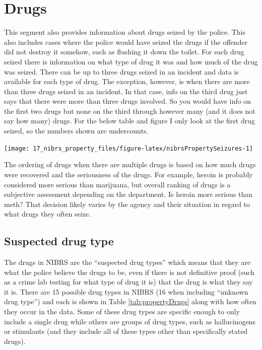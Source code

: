 \documentclass[
]{krantz}
\let\origfigure\figure
\let\endorigfigure\endfigure
\renewenvironment{figure}[1][2] {
    \expandafter\origfigure\expandafter[H]
} {
    \endorigfigure
}
\begin{document}
\section{Drugs}\label{drugs}

This segment also provides information about drugs seized by
the police. This also includes cases where the police would
have seized the drugs if the offender did not destroy it
somehow, such as flushing it down the toilet. For each drug
seized there is information on what type of drug it was and
how much of the drug was seized. There can be up to three
drugs seized in an incident and data is available for each
type of drug. The exception, however, is when there are more
than three drugs seized in an incident. In that case, info
on the third drug just says that there were more than three
drugs involved. So you would have info on the first two
drugs but none on the third through however many (and it
does not say how many) drugs. For the below table and figure
I only look at the first drug seized, so the numbers shown
are undercounts.

\begin{figure}

{\centering \texttt{[image: 17\_nibrs\_property\_files/figure-latex/nibrsPropertySeizures-1]} 

}

\caption{The annual number of drug seizures reported, 1991-2022.}\label{fig:nibrsPropertySeizures}
\end{figure}

The ordering of drugs when there are multiple drugs is based
on how much drugs were recovered and the seriousness of the
drugs. For example, heroin is probably considered more
serious than marijuana, but overall ranking of drugs is a
subjective assessment depending on the department. Is heroin
more serious than meth? That decision likely varies by the
agency and their situation in regard to what drugs they
often seize.

\subsection{Suspected drug type}\label{suspected-drug-type}

The drugs in NIBRS are the ``suspected drug types'' which
means that they are what the police believe the drugs to be,
even if there is not definitive proof (such as a crime lab
testing for what type of drug it is) that the drug is what
they say it is. There are 15 possible drug types in NIBRS
(16 when including ``unknown drug type'') and each is shown
in Table \ref{tab:propertyDrugs} along with how often they
occur in the data. Some of these drug types are specific
enough to only include a single drug while others are groups
of drug types, such as hallucinogens or stimulants (and they
include all of these types other than specifically stated
drugs).
\end{document}
